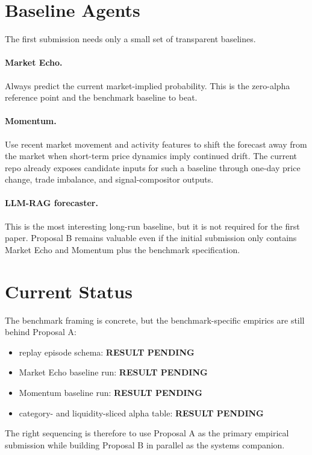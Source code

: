 \documentclass[10pt]{article}
\newcommand{\RESULTPENDING}{\textcolor{red!70!black}{\textbf{RESULT PENDING}}}
\begin{document}
\section{Baseline Agents}

The first submission needs only a small set of transparent baselines.

\paragraph{Market Echo.}
Always predict the current market-implied probability. This is the zero-alpha
reference point and the benchmark baseline to beat.

\paragraph{Momentum.}
Use recent market movement and activity features to shift the forecast away from
the market when short-term price dynamics imply continued drift. The current
repo already exposes candidate inputs for such a baseline through one-day price
change, trade imbalance, and signal-compositor outputs.

\paragraph{LLM-RAG forecaster.}
This is the most interesting long-run baseline, but it is not required for the
first paper. Proposal B remains valuable even if the initial submission only
contains Market Echo and Momentum plus the benchmark specification.

\section{Current Status}

The benchmark framing is concrete, but the benchmark-specific empirics are still
behind Proposal A:
\begin{itemize}[leftmargin=1.5em,itemsep=0.2em]
  \item replay episode schema: \RESULTPENDING
  \item Market Echo baseline run: \RESULTPENDING
  \item Momentum baseline run: \RESULTPENDING
  \item category- and liquidity-sliced alpha table: \RESULTPENDING
\end{itemize}

The right sequencing is therefore to use Proposal A as the primary empirical
submission while building Proposal B in parallel as the systems companion.
\end{document}
